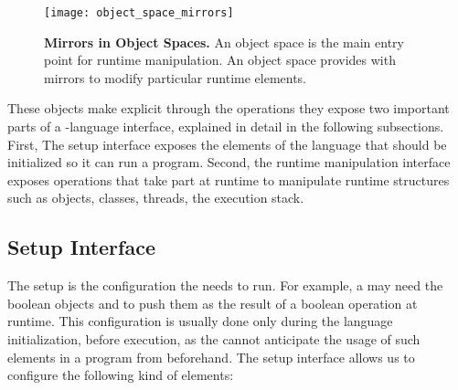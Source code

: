 \begin{figure}[htb]
\begin{center}
\texttt{[image: object\_space\_mirrors]}
\caption{\textbf{Mirrors in Object Spaces.} An object space is the main entry point for runtime manipulation. An object space provides with mirrors to modify particular runtime elements. \label{fig:objectSpaceMirrors}}
\end{center}
\end{figure}

These objects make explicit through the operations they expose two important parts of a \VM-language interface, explained in detail in the following subsections. First, The \VM setup interface exposes the elements of the language that should be initialized so it can run a program. Second, the runtime manipulation interface exposes operations that take part at runtime to manipulate runtime structures such as objects, classes, threads, the execution stack.

\subsection{\VM Setup Interface}

The \VM setup is the configuration the \VM needs to run.
For example, a \VM may need the boolean objects  and  to push them as the result of a boolean operation at runtime.
This configuration is usually done only during the language initialization, before execution, as the \VM cannot anticipate the usage of such elements in a program from beforehand.
The \VM setup interface allows us to configure the following kind of elements:

